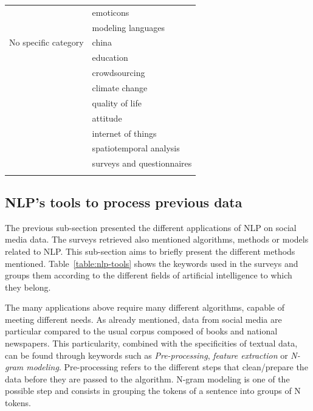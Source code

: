 \begin{center}
\begin{longtable}{ rl }
                                & emoticons                       \\
                                & modeling languages              \\
        No specific category    & china                           \\
                                & education                       \\
                                & crowdsourcing                   \\
                                & climate change                  \\
                                & quality of life                 \\
                                & attitude                        \\
                                & internet of things              \\
                                & spatiotemporal analysis         \\
                                & surveys and questionnaires      \\
        \bottomrule
        \label{table:application-domains}
    \end{longtable}
\end{center}

\subsection{NLP's tools to process previous data}
The previous sub-section presented the different applications of NLP on social media data.
The surveys retrieved also mentioned algorithms, methods or models related to NLP.
This sub-section aims to briefly present the different methods mentioned.
Table~\ref{table:nlp-tools} shows the keywords used in the surveys and groups them according to the different fields of artificial intelligence to which they belong.

The many applications above require many different algorithms, capable of meeting different needs.
As already mentioned, data from social media are particular compared to the usual corpus composed of books and national newspapers.
This particularity, combined with the specificities of textual data, can be found through keywords such as \emph{Pre-processing}, \emph{feature extraction} or \emph{N-gram modeling}.
Pre-processing refers to the different steps that clean/prepare the data before they are passed to the algorithm.
N-gram modeling is one of the possible step and consists in grouping the tokens of a sentence into groups of N tokens.


